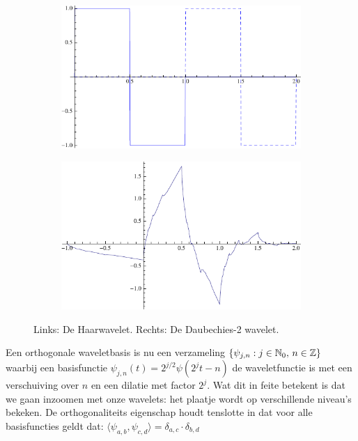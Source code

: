 \begin{figure}[h]
  \centering
  \begin{subfigure}{0.32\linewidth}
    \includegraphics[width=\linewidth]{plaatjes/db1.pdf}
  \end{subfigure}
  \begin{subfigure}{0.32\linewidth}
    \includegraphics[width=\linewidth]{plaatjes/db2_psi.pdf}
  \end{subfigure}
  \caption{Links: De Haarwavelet. Rechts: De Daubechies-2 wavelet.}
\label{fig:samenv}
\end{figure}

Een orthogonale waveletbasis is nu een verzameling $\{ \psi_{j,n}: j \in \mathbb{N}_0,\, n \in \mathbb{Z} \}$ waarbij een basisfunctie \mbox{$\psi_{j,n}(t) = 2^{j/2} \psi(2^jt - n)$} de waveletfunctie is met een verschuiving over $n$ en een dilatie met factor $2^j$. Wat dit in feite betekent is dat we gaan inzoomen met onze wavelets: het plaatje wordt op verschillende niveau's bekeken. De orthogonaliteits eigenschap houdt tenslotte in dat voor alle basisfuncties geldt dat: $\langle \psi_{a,b}, \psi_{c,d} \rangle = \delta_{a,c} \cdot \delta_{b,d}$

